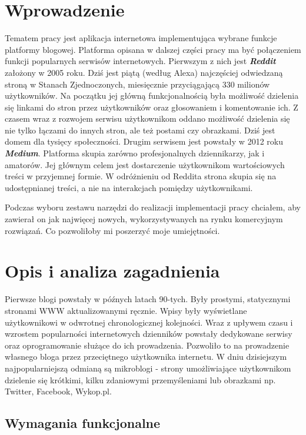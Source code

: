 \documentclass[declaration,shortabstract]{iithesis}
\author         {Oskar Sobczyk}
\date          {}                     %
\begin{document}

\chapter{Wprowadzenie}
Tematem pracy jest aplikacja internetowa implementująca wybrane funkcje platformy blogowej. Platforma opisana w dalszej części pracy ma być połączeniem funkcji popularnych serwisów internetowych. Pierwszym z nich jest \textit{\textbf{Reddit}} założony w 2005 roku. Dziś jest piątą (według Alexa) najczęściej odwiedzaną stroną w Stanach Zjednoczonych, miesięcznie przyciągającą 330 milionów użytkowników. Na początku jej główną funkcjonalnością była możliwość dzielenia się linkami do stron przez użytkowników oraz głosowaniem i komentowanie ich. Z czasem wraz z rozwojem serwisu użytkownikom oddano możliwość dzielenia się nie tylko łączami do innych stron, ale też postami czy obrazkami. Dziś jest domem dla tysięcy społeczności. Drugim serwisem jest powstały w 2012 roku \textit{\textbf{Medium}}. Platforma skupia zarówno profesjonalnych dziennikarzy, jak i amatorów. Jej głównym celem jest dostarczenie użytkownikom wartościowych treści w przyjemnej formie. W odróżnieniu od Reddita strona skupia się na udostępnianej treści, a nie na interakcjach pomiędzy użytkownikami.

Podczas wyboru zestawu narzędzi do realizacji implementacji pracy chciałem, aby zawierał on jak najwięcej nowych, wykorzystywanych na rynku komercyjnym rozwiązań. Co pozwoliłoby mi poszerzyć moje umiejętności.

\chapter{Opis i analiza zagadnienia}

Pierwsze blogi powstały w późnych latach 90-tych. Były prostymi, statycznymi stronami WWW aktualizowanymi ręcznie. Wpisy były wyświetlane użytkownikowi w odwrotnej chronologicznej kolejności. Wraz z upływem czasu i wzrostem popularności internetowych dzienników powstały dedykowane serwisy oraz oprogramowanie służące do ich prowadzenia. Pozwoliło to na prowadzenie własnego bloga przez przeciętnego użytkownika internetu. W dniu dzisiejszym najpopularniejszą odmianą są mikroblogi - strony umożliwiające użytkownikom dzielenie się krótkimi, kilku zdaniowymi przemyśleniami lub obrazkami np. Twitter, Facebook, Wykop.pl.

\section{Wymagania funkcjonalne}
\end{document}
